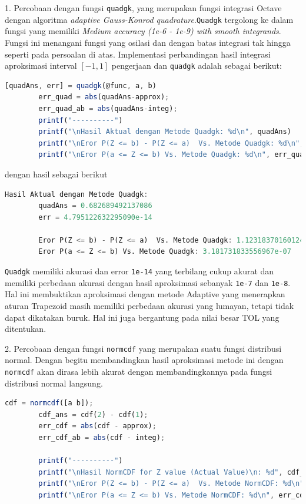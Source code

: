 \documentclass[journal,12pt,onecolumn,a4paper]{IEEEtran}
\begin{document}
1. Percobaan dengan fungsi \lstinline{quadgk}, yang merupakan fungsi integrasi Octave dengan algoritma \emph{adaptive Gauss-Konrod quadrature}.\lstinline{Quadgk} tergolong ke dalam fungsi yang memiliki \emph{Medium accuracy (1e-6 - 1e-9) with smooth integrands}. Fungsi ini menangani fungsi yang osilasi dan dengan batas integrasi tak hingga seperti pada persoalan di atas. Implementasi perbandingan hasil integrasi aproksimasi interval \([-1,1]\) pengerjaan dan \lstinline{quadgk} adalah sebagai berikut:
\begin{center}
	\begin{lstlisting}[language=Octave]
		[quadAns, err] = quadgk(@func, a, b)
		err_quad = abs(quadAns-approx);
		err_quad_ab = abs(quadAns-integ);
		printf("----------")
		printf("\nHasil Aktual dengan Metode Quadgk: %d\n", quadAns)
		printf("\nEror P(Z <= b) - P(Z <= a)  Vs. Metode Quadgk: %d\n", err_quad)
		printf("\nEror P(a <= Z <= b) Vs. Metode Quadgk: %d\n", err_quad_ab)
	\end{lstlisting}
\end{center}

dengan hasil sebagai berikut

\begin{center}
	\begin{lstlisting}[language=Octave]
		Hasil Aktual dengan Metode Quadgk: 
		quadAns = 0.682689492137086
		err = 4.795122632295090e-14  

		Eror P(Z <= b) - P(Z <= a)  Vs. Metode Quadgk: 1.123183701601249e-08
		Eror P(a <= Z <= b) Vs. Metode Quadgk: 3.181731833556967e-07
	\end{lstlisting}
\end{center}

\lstinline{Quadgk} memiliki akurasi dan error \lstinline{1e-14} yang terbilang cukup akurat dan memiliki perbedaan akurasi dengan hasil aproksimasi sebanyak \lstinline{1e-7} dan \lstinline{1e-8}. Hal ini membuktikan aproksimasi dengan metode Adaptive yang menerapkan aturan Trapezoid masih memiliki perbedaan akurasi yang lumayan, tetapi tidak dapat dikatakan buruk. Hal ini juga bergantung pada nilai besar TOL yang ditentukan.


2. Percobaan dengan fungsi \lstinline{normcdf} yang merupakan suatu fungsi distribusi normal. Dengan begitu membandingkan hasil aproksimasi metode ini dengan \lstinline{normcdf} akan dirasa lebih akurat dengan membandingkannya pada fungsi distribusi normal langsung.

\begin{center}
	\begin{lstlisting}[language=Octave]
		cdf = normcdf([a b]);
		cdf_ans = cdf(2) - cdf(1);
		err_cdf = abs(cdf - approx);
		err_cdf_ab = abs(cdf - integ);

		printf("----------")
		printf("\nHasil NormCDF for Z value (Actual Value)\n: %d", cdf_ans)
		printf("\nEror P(Z <= b) - P(Z <= a)  Vs. Metode NormCDF: %d\n", err_cdf)
		printf("\nEror P(a <= Z <= b) Vs. Metode NormCDF: %d\n", err_cdf_ab)
	\end{lstlisting}
\end{center}
\end{document}
